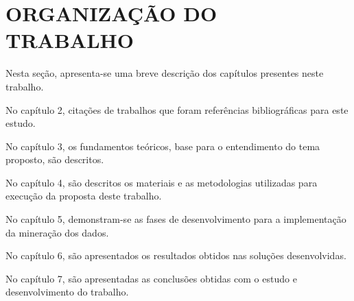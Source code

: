 \section{ORGANIZAÇÃO DO TRABALHO}\label{sec:organizacao-trabalho}

Nesta seção, apresenta-se uma breve descrição dos capítulos presentes neste trabalho.

No capítulo 2, citações de trabalhos que foram referências bibliográficas para este estudo.

No capítulo 3, os fundamentos teóricos, base para o entendimento do tema proposto, são descritos.

No capítulo 4, são descritos os materiais e as metodologias utilizadas para execução da proposta deste trabalho.

No capítulo 5, demonstram-se as fases de desenvolvimento para a implementação da mineração dos dados.

No capítulo 6, são apresentados os resultados obtidos nas soluções desenvolvidas.

No capítulo 7, são apresentadas as conclusões obtidas com o estudo e desenvolvimento do trabalho.

